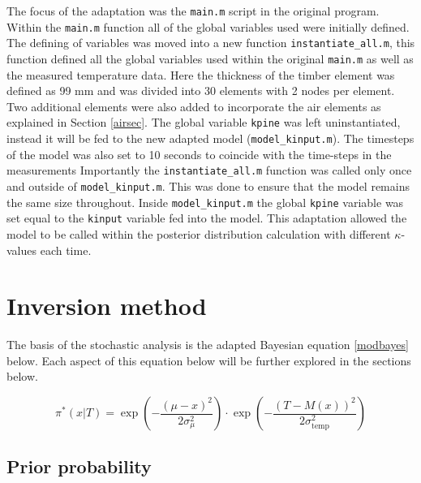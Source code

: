 	The focus of the adaptation was the \texttt{main.m} script in the original program. 
	Within the \texttt{main.m} function all of the global variables used were initially defined.
	The defining of variables was moved into a new function \texttt{instantiate\_all.m}, this function defined all the global variables used within the original \texttt{main.m} as well as the measured temperature data. 
	Here the thickness of the timber element was defined as 99 mm and was divided into 30 elements with 2 nodes per element. 
	Two additional elements were also added to incorporate the air elements as explained in Section \ref{airsec}.
	The global variable \texttt{kpine} was left uninstantiated, instead it will be fed to the new adapted model (\texttt{model\_kinput.m}).
	The timesteps of the model was also set to 10 seconds to coincide with the time-steps in the measurements
	Importantly the \texttt{instantiate\_all.m} function was called only once and outside of \texttt{model\_kinput.m}.
	This was done to ensure that the model remains the same size throughout.
	Inside \texttt{model\_kinput.m} the global \texttt{kpine} variable was set equal to the \texttt{kinput} variable fed into the model.
	This adaptation allowed the model to be called within the posterior distribution calculation with different $\kappa$-values each time.
	
\section{Inversion method}\label{secInvmet}

%
The basis of the stochastic analysis is the adapted Bayesian equation \ref{modbayes} below. 
Each aspect of this equation below will be further explored in the sections below.

\begin{equation}
\label{modbayes}
\pi^* (x|T) = \exp\left(-\frac{(\mu - x)^2}{2\sigma_{\mu}^2}\right) \cdot \exp\left(-\frac{\left(T-M(x)\right)^2}{2\sigma_{\text{temp}}^2}\right)
\end{equation}

	\subsection{Prior probability}
	
